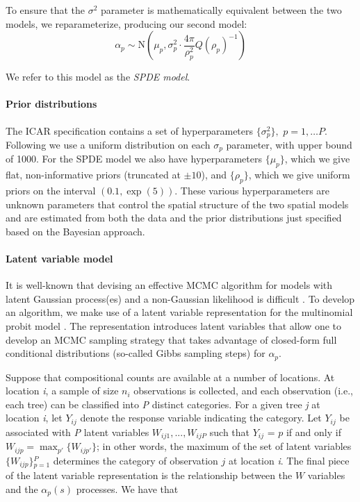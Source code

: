 \documentclass[10pt,letterpaper]{article}
\begin{document}
To ensure that the $\sigma^{2}$ parameter is mathematically equivalent
between the two models, we reparameterize, producing our second model:
\[
\alpha_{p}\sim\mbox{N}\left(\mu_{p},\sigma_{p}^{2}\cdot\frac{4\pi}{\rho_{p}^{2}}Q(\rho_{p})^{-1}\right)
\]


We refer to this model as the \emph{SPDE model}.



\paragraph*{Prior distributions}

\noindent The ICAR specification contains a set of hyperparameters
$\{\sigma_{p}^{2}\},$ $p=1,\ldots P$. Following \cite{Gelm:2006}
we use a uniform distribution on each $\sigma_{p}$ parameter, with
upper bound of 1000. For the SPDE model we also have hyperparameters
$\{\mu_{p}\}$, which we give flat, non-informative priors (truncated
at $\pm10$), and $\{\rho_{p}\}$, which we give uniform priors on
the interval $(0.1,\exp(5))$. These various hyperparameters
are unknown parameters that control the spatial structure of the two
spatial models and are estimated from both the data and the prior
distributions just specified based on the Bayesian approach.


\paragraph*{Latent variable model\label{sub:Latent-Variable-Model}}

It is well-known that devising an effective MCMC algorithm for models
with latent Gaussian process(es) and a non-Gaussian likelihood is
difficult \cite{Rue:Held:2005,Chri:etal:2006,Tan:Nott:2013}. To
develop an algorithm, we make use of a latent variable representation
for the multinomial probit model \cite{McCu:Ross:1994}. The representation
introduces latent variables that allow one to develop an MCMC sampling
strategy that takes advantage of closed-form full conditional distributions
(so-called Gibbs sampling steps) for $\alpha_{p}$.

Suppose that compositional counts are available at a number of locations.
At location \emph{i}, a sample of size $n_{i}$ observations is collected,
and each observation (i.e., each tree) can be classified into \emph{P}
distinct categories. For a given tree \emph{j} at location \emph{i}, let $Y_{ij}$
denote the response variable indicating the category. Let $Y_{ij}$
be associated with \emph{P} latent variables $W_{ij1},...,W_{ijP}$ such
that $Y_{ij}$ = $p$ if and only if $W_{ijp}={\displaystyle \max_{p'}\big\{ W_{ijp'}\big\}}$;
in other words, the maximum of the set of latent variables $\{W_{ijp}\}{\displaystyle _{p=1}^{P}}$
determines the category of observation $j$ at location \emph{i}. The
final piece of the latent variable representation is the relationship
between the $W$ variables and the $\alpha_{p}(s)$ processes. We
have that
\end{document}
